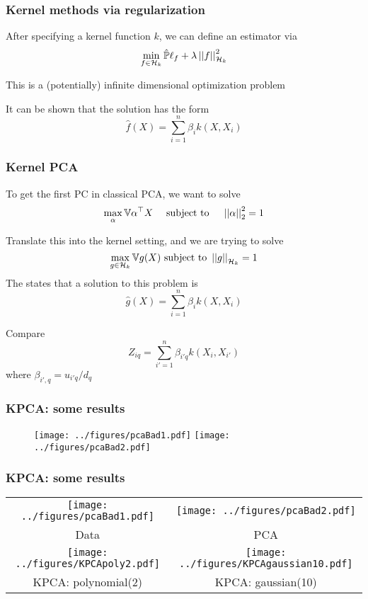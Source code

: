 \documentclass{beamer}
\begin{document}
\begin{frame}
\frametitle{Kernel methods via regularization}
After specifying a kernel function $k$, we can define an estimator via
\[
\min_{f \in \mathcal{H}_k} \hat{\mathbb{P}} \ell_f + \lambda \left|\left| f \right|\right|_{\mathcal{H}_k}^2
\]

\vsp
This is a (potentially) infinite dimensional optimization problem 


\vsp
It can be shown that the solution has the form
\[
\hat{f}(X) = \sum_{i=1}^n \beta_i k(X,X_i)
\]
\end{frame}
\begin{frame}[fragile]
  \frametitle{Kernel PCA}
     To get the first PC in classical PCA, we want to solve
  \[
  \max_\alpha \mathbb{V} \alpha^{\top}X \quad \textrm{ subject to } \quad \left|\left| \alpha \right|\right|_2^2 = 1
  \]

\vsp

Translate this into the kernel setting, and we are trying to solve
\[
\max_{g \in \mathcal{H}_k} \mathbb{V} g(X) \textrm{ subject to } \left|\left| g \right|\right|_{\mathcal{H}_k} = 1
\]
The  states that a solution to this problem is
\[
\hat{g}(X) = \sum_{i=1}^n \beta_i k(X,X_i)
\]
\vsp

Compare
\[
Z_{iq} = \sum_{i'=1}^n \beta_{i'q} k(X_i,X_{i'})
\]
where $\beta_{i',q} = u_{i'q}/d_q$
\end{frame}

\begin{frame}
  \frametitle{KPCA: some results}
  \begin{figure}
    \centering
    \texttt{[image: ../figures/pcaBad1.pdf]}
    \texttt{[image: ../figures/pcaBad2.pdf]}    
  \end{figure}
  \end{frame}

\begin{frame}
  \frametitle{KPCA: some results}
\begin{tabular}{cc}
    \texttt{[image: ../figures/pcaBad1.pdf]}&
    \texttt{[image: ../figures/pcaBad2.pdf]}    \\
    Data & PCA \\
        \texttt{[image: ../figures/KPCApoly2.pdf]}    &
                \texttt{[image: ../figures/KPCAgaussian10.pdf]}     \\
            KPCA: polynomial(2) &                 KPCA: gaussian(10)
\end{tabular}
  \end{frame}
\end{document}
